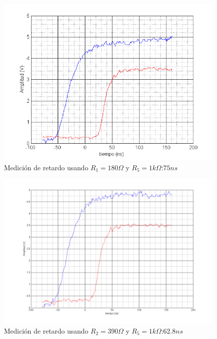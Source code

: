 \documentclass[12pt,a4paper]{article}
\begin{document}
\begin{figure}[H]
\centering
\includegraphics[width=\textwidth]{img/Delay1.png}
\caption{Medición de retardo usando $R_1=180\Omega$ y $R_5=1k\Omega$:$75ns$}
\end{figure}

\begin{figure}[H]
\centering
\includegraphics[width=\textwidth]{img/Delay2.png}
\caption{Medición de retardo usando $R_2=390\Omega$ y $R_5=1k\Omega$:$62.8ns$}
\end{figure}
\end{document}
